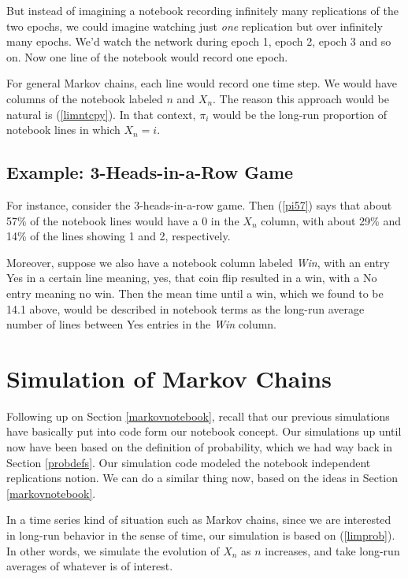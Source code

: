 But instead of imagining a notebook recording infinitely many
replications of the two epochs, we could imagine watching just {\it one}
replication but over infinitely many epochs.  We'd watch the network
during epoch 1, epoch 2, epoch 3 and so on.  Now one line of the
notebook would record one epoch.  

For general Markov chains, each line would record one time step.  We
would have columns of the notebook labeled $n$ and $X_n$.  The reason
this approach would be natural is (\ref{limntcpy}).  In that context,
$\pi_i$ would be the long-run proportion of notebook lines in which $X_n
= i$.

\subsection{Example:  3-Heads-in-a-Row Game}

For instance, consider the 3-heads-in-a-row game.  Then (\ref{pi57})
says that about 57\% of the notebook lines would have a 0 in the $X_n$
column, with about 29\% and 14\% of the lines showing 1 and 2,
respectively.

Moreover, suppose we also have a notebook column labeled {\it Win}, with
an entry Yes in a certain line meaning, yes, that coin flip resulted in
a win, with a No entry meaning no win.  Then the mean time until a win,
which we found to be 14.1 above, would be described in notebook terms as
the long-run average number of lines between Yes entries in the {\it
Win} column.

\section{Simulation of Markov Chains}

Following up on Section \ref{markovnotebook}, recall that our previous
simulations have basically put into code form our notebook concept.  Our
simulations up until now have been based on the definition of
probability, which we had way back in Section \ref{probdefs}.  Our
simulation code modeled the notebook independent replications notion.
We can do a similar thing now, based on the ideas in Section
\ref{markovnotebook}.

In a time series kind of situation such as Markov chains, since
we are interested in long-run behavior in the sense of time, our
simulation is based on (\ref{limprob}).  In other words, we simulate
the evolution of $X_n$ as $n$ increases, and take long-run averages of
whatever is of interest.


